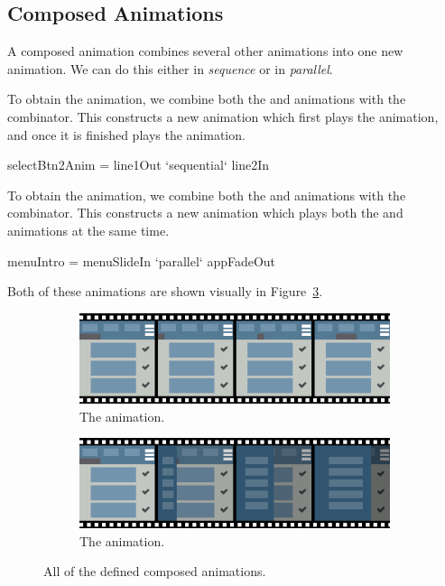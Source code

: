 \subsection{Composed Animations}

A composed animation combines several other animations into one new animation. We can do this either in \emph{sequence} or in \emph{parallel}.

To obtain the  animation, we combine both the  and  animations with the  combinator. This constructs a new animation which first plays the  animation, and once it is finished plays the  animation.

\begin{spec}
selectBtn2Anim = line1Out `sequential` line2In
\end{spec}

To obtain the  animation, we combine both the  and  animations with the  combinator. This constructs a new animation which plays both the  and  animations at the same time.

\begin{spec}
menuIntro = menuSlideIn `parallel` appFadeOut
\end{spec}

Both of these animations are shown visually in Figure~\ref{fig:composed}.

\begin{figure}[!htbp]
\centering

\begin{subfigure}[h]{\textwidth}
\centering
\includegraphics[width=\figscale\textwidth]{pictures/selectBtn2AnimFig}
\caption{The  animation.}
\label{fig:composed1}
\end{subfigure}

\begin{subfigure}[h]{\textwidth}
\centering
\includegraphics[width=\figscale\textwidth]{pictures/menuIntroFig}
\caption{The  animation.}
\label{fig:composed2}
\end{subfigure}

\caption{All of the defined composed animations.}
\label{fig:composed}
\end{figure}
